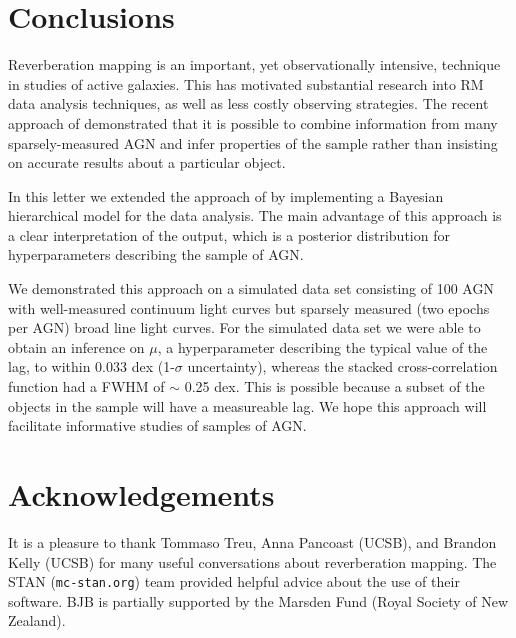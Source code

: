 \documentclass[useAMS,usenatbib]{mn2e}
\begin{document}
\section{Conclusions}\label{sec:conclusions}
Reverberation mapping is an important, yet observationally intensive,
technique in studies of active galaxies. This has motivated substantial
research into RM data analysis techniques, as well as less costly observing
strategies. The recent approach of \citet{2012MNRAS.427.2701F} demonstrated
that it is possible to combine information from many sparsely-measured AGN
and infer properties of the sample rather than insisting on accurate results
about a particular object.

In this letter we extended the approach of \citet{2012MNRAS.427.2701F} by
implementing a Bayesian hierarchical model for the data analysis. The main
advantage of this approach is a clear interpretation of the output, which is
a posterior distribution for hyperparameters describing the sample of AGN.

We demonstrated this approach on a simulated data set consisting of 100 AGN
with well-measured continuum light curves but sparsely measured (two epochs per
AGN) broad line light curves. For the simulated data set we were able to obtain
an inference on $\mu$, a hyperparameter describing the typical value of the lag,
to within 0.033 dex (1-$\sigma$ uncertainty), whereas the stacked cross-correlation
function had a FWHM of $\sim$ 0.25 dex. This is possible because a subset of
the objects in the sample will have a measureable lag. We hope this approach
will facilitate informative studies of samples of AGN.

\section*{Acknowledgements}
It is a pleasure to thank Tommaso Treu, Anna Pancoast (UCSB), and
Brandon Kelly (UCSB) for many
useful conversations about reverberation mapping. The STAN ({\tt mc-stan.org})
team provided helpful advice about the use of their software. BJB is partially
supported by the Marsden Fund (Royal Society of New Zealand).
\end{document}

